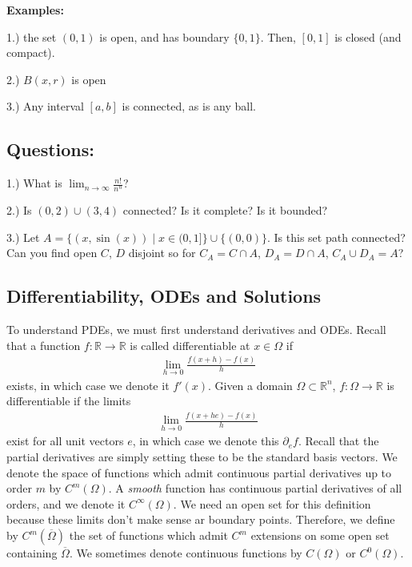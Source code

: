 \documentclass{article}
\newcommand{\R}{{\mathbb{R}}}
\newcommand{\cl}[1]{{\overline{#1}}}
\newcommand{\pd}{\partial}
\begin{document}
	
	\textbf{Examples:}
	
	1.) the set $(0,1)$ is open, and has boundary $\{0,1\}$. Then, $[0,1]$ is closed (and compact). 
	
	2.) $B(x,r)$ is open
	
	3.) Any interval $[a,b]$ is connected, as is any ball. 
	
	
	\subsection{Questions:}
	
	1.) What is $\lim_{n \to \infty} \frac{n!}{n^{n}}$? 
	
	2.) Is $(0,2) \cup (3,4)$ connected? Is it complete? Is it bounded?
	
	3.) Let $A = \{ (x,\sin(x)) \mid x \in (0,1]\} \cup \{ (0,0)\}$. Is this set path connected? Can you find open $C$, $D$ disjoint so for $C_{A} = C \cap A$, $D_{A} = D \cap A$, $C_{A} \cup D_{A} = A$?
	
	
	\subsection{Differentiability, ODEs and Solutions}
	
	To understand PDEs, we must first understand derivatives and ODEs. Recall that a function $f: \R \to \R$ is called differentiable at $x \in \Omega$ if 
	\begin{align*}
		\lim_{h \to 0} \frac{f(x+h)-f(x)}{h}
	\end{align*}
	exists, in which case we denote it $f'(x)$. Given a domain $\Omega \subset \R^{n}$, $f:\Omega \to \R$ is differentiable if the limits 
	\begin{align*}
		\lim_{h \to 0} \frac{f(x+he)-f(x)}{h}
	\end{align*}
	exist for all unit vectors $e$, in which case we denote this $\pd_{e} f$. Recall that the partial derivatives are simply setting these to be the standard basis vectors. We denote the space of functions which admit continuous partial derivatives up to order $m$ by $C^{m}(\Omega)$. A \textit{smooth} function has continuous partial derivatives of all orders, and we denote it $C^{\infty}(\Omega)$. We need an open set for this definition because these limits don't make sense ar boundary points. Therefore, we define by $C^{m}(\cl{\Omega})$ the set of functions which admit $C^{m}$ extensions on some open set containing $\cl{\Omega}$. We sometimes denote continuous functions by $C(\Omega)$ or $C^{0}(\Omega)$. 
	
\end{document}
